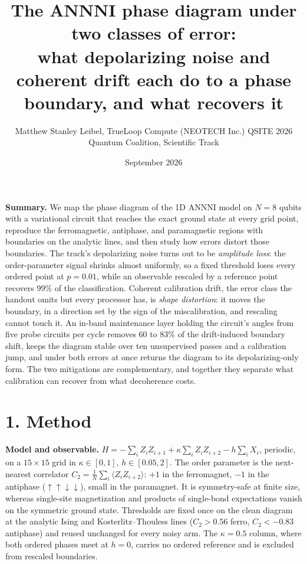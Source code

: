 \documentclass[10pt,letterpaper]{article}
\title{\vspace{-18pt}\large The ANNNI phase diagram under two classes of error:\\ what depolarizing noise and coherent drift each do to a phase boundary, and what recovers it}
\author{\normalsize Matthew Stanley Leibel, TrueLoop Compute (NEOTECH Inc.) \quad QSITE 2026 Quantum Coalition, Scientific Track}
\date{\normalsize September 2026}
\begin{document}
\maketitle\vspace{-16pt}

\textbf{Summary.} We map the phase diagram of the 1D ANNNI model on $N=8$ qubits with a variational circuit that reaches the exact ground state at every grid point, reproduce the ferromagnetic, antiphase, and paramagnetic regions with boundaries on the analytic lines, and then study how errors distort those boundaries. The track's depolarizing noise turns out to be \emph{amplitude loss}: the order-parameter signal shrinks almost uniformly, so a fixed threshold loses every ordered point at $p=0.01$, while an observable rescaled by a reference point recovers 99\% of the classification. Coherent calibration drift, the error class the handout omits but every processor has, is \emph{shape distortion}: it moves the boundary, in a direction set by the sign of the miscalibration, and rescaling cannot touch it. An in-band maintenance layer holding the circuit's angles from five probe circuits per cycle removes 60 to 83\% of the drift-induced boundary shift, keeps the diagram stable over ten unsupervised passes and a calibration jump, and under both errors at once returns the diagram to its depolarizing-only form. The two mitigations are complementary, and together they separate what calibration can recover from what decoherence costs.

\section*{1. Method}
\textbf{Model and observable.} $H=-\sum_i Z_iZ_{i+1}+\kappa\sum_i Z_iZ_{i+2}-h\sum_i X_i$, periodic, on a $15\times15$ grid in $\kappa\in[0,1]$, $h\in[0.05,2]$. The order parameter is the next-nearest correlator $C_2=\tfrac1N\sum_i\langle Z_iZ_{i+2}\rangle$: $+1$ in the ferromagnet, $-1$ in the antiphase ($\uparrow\uparrow\downarrow\downarrow$), small in the paramagnet. It is symmetry-safe at finite size, whereas single-site magnetization and products of single-bond expectations vanish on the symmetric ground state. Thresholds are fixed once on the clean diagram at the analytic Ising and Kosterlitz--Thouless lines ($C_2>0.56$ ferro, $C_2<-0.83$ antiphase) and reused unchanged for every noisy arm. The $\kappa=0.5$ column, where both ordered phases meet at $h=0$, carries no ordered reference and is excluded from rescaled boundaries.
\end{document}
